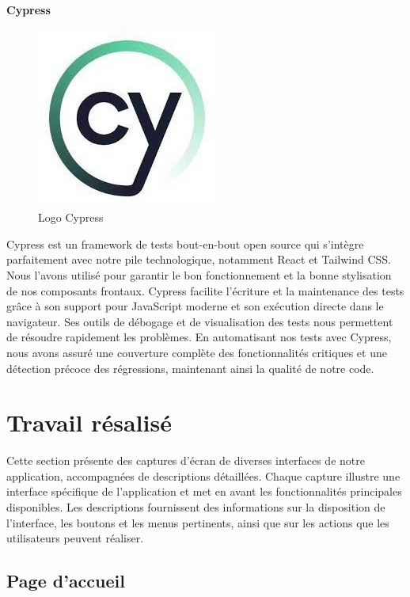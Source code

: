 \large
\textbf{Cypress}
\begin{figure}[htbp]
   \centering
   \includegraphics[scale=0.6]{Images/cy.jpg} 
   \caption{Logo Cypress}
   \label{fig:cypress}
\end{figure}

Cypress est un framework de tests bout-en-bout open source qui 
s'intègre parfaitement avec notre pile technologique, notamment 
React et Tailwind CSS. Nous l'avons utilisé pour garantir le bon 
fonctionnement et la bonne stylisation de nos composants 
frontaux. Cypress facilite l'écriture et la maintenance des 
tests grâce à son support pour JavaScript moderne et son 
exécution directe dans le navigateur. Ses outils de débogage 
et de visualisation des tests nous permettent de résoudre 
rapidement les problèmes\cite{Cypress}. En automatisant nos tests avec Cypress, 
nous avons assuré une couverture complète des fonctionnalités 
critiques et une détection précoce des régressions, maintenant 
ainsi la qualité de notre code.

\section{Travail résalisé}
Cette section présente des captures d'écran de diverses interfaces de notre application, accompagnées de descriptions  détaillées.  Chaque  capture  illustre une interface spécifique de l'application et met en avant les fonctionnalités principales disponibles. Les descriptions fournissent des informations sur la disposition de l'interface, les boutons et les menus pertinents, ainsi que sur les actions que les utilisateurs peuvent réaliser.
\subsection{Page d'accueil}

